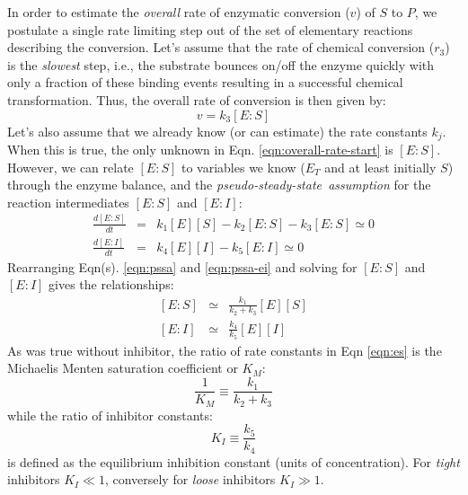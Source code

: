 \documentclass[11pt]{article}
\theoremstyle{definition}
\begin{document}
In order to estimate the \emph{overall} rate of enzymatic conversion ($v$) of $S$ to $P$, we postulate a single rate limiting step out of the set of elementary reactions describing the conversion.
Let's assume that the rate of chemical conversion ($r_{3}$) is the \emph{slowest} step, i.e., the substrate bounces on/off the enzyme quickly with only a fraction of these binding events resulting in a successful chemical transformation. Thus, the overall rate of conversion is then given by:
\begin{equation}\label{eqn:overall-rate-start}
	v = k_{3}\left[E:S\right]
\end{equation}
Let's also assume that we already know (or can estimate) the rate constants $k_{j}$.
When this is true, the only unknown in Eqn. \eqref{eqn:overall-rate-start} is $\left[E:S\right]$.
However, we can relate $\left[E:S\right]$ to variables we know ($E_{T}$ and at least initially $S$) through the enzyme balance,
and the \emph{pseudo-steady-state~assumption} for the reaction intermediates $\left[E:S\right]$ and $\left[E:I\right]$:
\begin{eqnarray}\label{eqn:pssa}
	\frac{d\left[E:S\right]}{dt} &=& k_{1}\left[E\right]\left[S\right] - k_{2}\left[E:S\right] - k_{3}\left[E:S\right]\simeq{0}\\\label{eqn:pssa-ei}
	\frac{d\left[E:I\right]}{dt} &=& k_{4}\left[E\right]\left[I\right] - k_{5}\left[E:I\right]\simeq{0}
\end{eqnarray}
Rearranging Eqn(s). \eqref{eqn:pssa} and \eqref{eqn:pssa-ei} and solving for $\left[E:S\right]$ and $\left[E:I\right]$ gives the relationships:
\begin{eqnarray}\label{eqn:es}
	\left[E:S\right]&\simeq&\frac{k_{1}}{k_{2}+k_{3}}\left[E\right]\left[S\right]\\
	\left[E:I\right]&\simeq&\frac{k_{4}}{k_{5}}\left[E\right]\left[I\right]
\end{eqnarray}As was true without inhibitor, the ratio of rate constants in Eqn \eqref{eqn:es} is the Michaelis Menten saturation coefficient or $K_{M}$:
\begin{equation}
	\frac{1}{K_{M}}\equiv\frac{k_{1}}{k_{2}+k_{3}}
\end{equation}while the ratio of inhibitor constants:
\begin{equation}
K_{I} \equiv \frac{k_{5}}{k_{4}}
\end{equation}is defined as the equilibrium inhibition constant (units of concentration).
For \emph{tight} inhibitors $K_{I}\ll{1}$, conversely for \emph{loose} inhibitors $K_{I}\gg{1}$.
\end{document}
